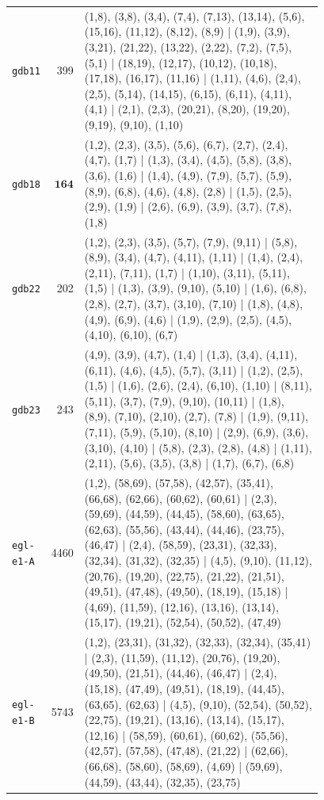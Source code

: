 \begin{landscape}
\begin{longtable}{lr>{\tiny\raggedright\arraybackslash}p{0.78\linewidth}}
\texttt{gdb11} & 399 & (1,8), (3,8), (3,4), (7,4), (7,13), (13,14), (5,6), (15,16), (11,12), (8,12), (8,9) | (1,9), (3,9), (3,21), (21,22), (13,22), (2,22), (7,2), (7,5), (5,1) | (18,19), (12,17), (10,12), (10,18), (17,18), (16,17), (11,16) | (1,11), (4,6), (2,4), (2,5), (5,14), (14,15), (6,15), (6,11), (4,11), (4,1) | (2,1), (2,3), (20,21), (8,20), (19,20), (9,19), (9,10), (1,10) \\[2pt]
\texttt{gdb18} & $\mathbf{164}$ & (1,2), (2,3), (3,5), (5,6), (6,7), (2,7), (2,4), (4,7), (1,7) | (1,3), (3,4), (4,5), (5,8), (3,8), (3,6), (1,6) | (1,4), (4,9), (7,9), (5,7), (5,9), (8,9), (6,8), (4,6), (4,8), (2,8) | (1,5), (2,5), (2,9), (1,9) | (2,6), (6,9), (3,9), (3,7), (7,8), (1,8) \\[2pt]
\texttt{gdb22} & 202 & (1,2), (2,3), (3,5), (5,7), (7,9), (9,11) | (5,8), (8,9), (3,4), (4,7), (4,11), (1,11) | (1,4), (2,4), (2,11), (7,11), (1,7) | (1,10), (3,11), (5,11), (1,5) | (1,3), (3,9), (9,10), (5,10) | (1,6), (6,8), (2,8), (2,7), (3,7), (3,10), (7,10) | (1,8), (4,8), (4,9), (6,9), (4,6) | (1,9), (2,9), (2,5), (4,5), (4,10), (6,10), (6,7) \\[2pt]
\texttt{gdb23} & 243 & (4,9), (3,9), (4,7), (1,4) | (1,3), (3,4), (4,11), (6,11), (4,6), (4,5), (5,7), (3,11) | (1,2), (2,5), (1,5) | (1,6), (2,6), (2,4), (6,10), (1,10) | (8,11), (5,11), (3,7), (7,9), (9,10), (10,11) | (1,8), (8,9), (7,10), (2,10), (2,7), (7,8) | (1,9), (9,11), (7,11), (5,9), (5,10), (8,10) | (2,9), (6,9), (3,6), (3,10), (4,10) | (5,8), (2,3), (2,8), (4,8) | (1,11), (2,11), (5,6), (3,5), (3,8) | (1,7), (6,7), (6,8) \\[2pt]
\texttt{egl-e1-A} & 4460 & (1,2), (58,69), (57,58), (42,57), (35,41), (66,68), (62,66), (60,62), (60,61) | (2,3), (59,69), (44,59), (44,45), (58,60), (63,65), (62,63), (55,56), (43,44), (44,46), (23,75), (46,47) | (2,4), (58,59), (23,31), (32,33), (32,34), (31,32), (32,35) | (4,5), (9,10), (11,12), (20,76), (19,20), (22,75), (21,22), (21,51), (49,51), (47,48), (49,50), (18,19), (15,18) | (4,69), (11,59), (12,16), (13,16), (13,14), (15,17), (19,21), (52,54), (50,52), (47,49) \\[2pt]
\texttt{egl-e1-B} & 5743 & (1,2), (23,31), (31,32), (32,33), (32,34), (35,41) | (2,3), (11,59), (11,12), (20,76), (19,20), (49,50), (21,51), (44,46), (46,47) | (2,4), (15,18), (47,49), (49,51), (18,19), (44,45), (63,65), (62,63) | (4,5), (9,10), (52,54), (50,52), (22,75), (19,21), (13,16), (13,14), (15,17), (12,16) | (58,59), (60,61), (60,62), (55,56), (42,57), (57,58), (47,48), (21,22) | (62,66), (66,68), (58,60), (58,69), (4,69) | (59,69), (44,59), (43,44), (32,35), (23,75) \\[2pt]

\end{longtable}
\end{landscape}
